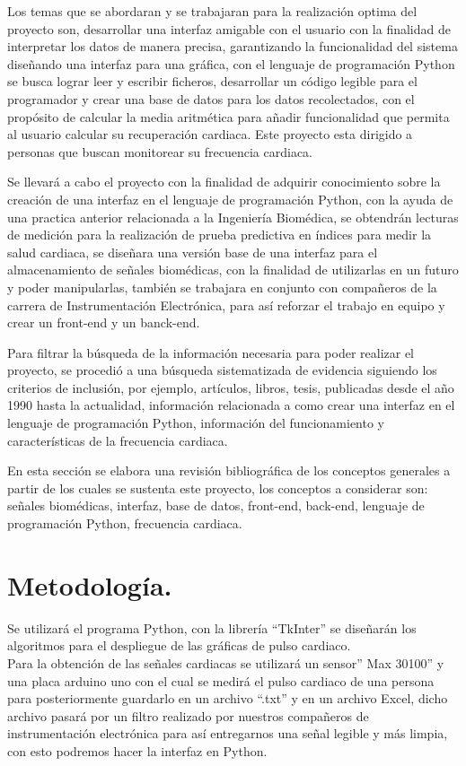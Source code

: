 \documentclass{report}
\begin{document}
		Los temas que se abordaran y se trabajaran para la realización optima del proyecto son, desarrollar una interfaz amigable con el usuario con la finalidad de interpretar los datos de manera precisa, garantizando la funcionalidad del sistema diseñando una interfaz para una gráfica, con el lenguaje de programación Python se busca lograr leer y escribir ficheros, desarrollar un código legible para el programador y crear una base de datos para los datos recolectados, con el propósito de calcular la media aritmética para añadir funcionalidad que permita al usuario calcular su recuperación cardiaca. Este proyecto esta dirigido a personas que buscan monitorear su frecuencia cardiaca.  
		
		Se llevará a cabo el proyecto con la finalidad de adquirir conocimiento sobre la creación de una interfaz en el lenguaje de programación Python, con la ayuda de una practica anterior relacionada a la Ingeniería Biomédica, se obtendrán lecturas de medición para la realización de prueba predictiva en índices para medir la salud cardiaca, se diseñara una versión base de una interfaz para el almacenamiento de señales biomédicas, con la finalidad de utilizarlas en un futuro y poder manipularlas, también se trabajara en conjunto con compañeros de la carrera de Instrumentación Electrónica, para así reforzar el trabajo en equipo y crear un front-end y un banck-end. 
		
		Para filtrar la búsqueda de la información necesaria para poder realizar el proyecto, se procedió a una búsqueda sistematizada de evidencia siguiendo los criterios de inclusión, por ejemplo, artículos, libros, tesis, publicadas desde el año 1990 hasta la actualidad, información relacionada a como crear una interfaz en el lenguaje de programación Python, información del funcionamiento y características de la frecuencia cardiaca. 
		
		En esta sección se elabora una revisión bibliográfica de los conceptos generales a partir de los cuales se sustenta este proyecto, los conceptos a considerar son: señales biomédicas, interfaz, base de datos, front-end, back-end, lenguaje de programación Python, frecuencia cardiaca.
		\cite{monografias}
		\cite{rae_interfaz}
		\cite{FrontendBackend}
		\cite{unam} 
		\cite{elsevierRecuperacinFrecuencia}
		\cite{uniriojaSistemaMonitorizacin}
			
	\section{Metodología.}
	Se utilizará el programa Python, con la librería “TkInter” se diseñarán los algoritmos para el despliegue de las gráficas de pulso cardiaco. \\
	Para la obtención de las señales cardiacas se utilizará un sensor” Max 30100” y una placa arduino uno con el cual se medirá el pulso cardiaco de una persona para posteriormente guardarlo en un archivo “.txt” y en un archivo Excel, dicho archivo pasará por un filtro realizado por nuestros compañeros de instrumentación electrónica para así entregarnos una señal legible y más limpia, con esto podremos hacer la interfaz en Python.
	
	
	
	\printbibliography
\end{document}
